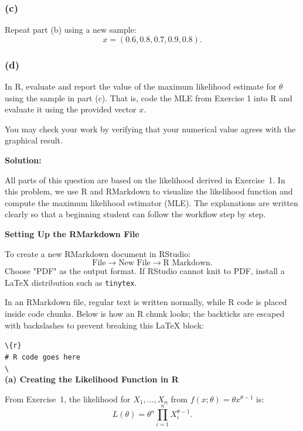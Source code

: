 \documentclass[11pt,letterpaper]{article}
\theoremstyle{remark}
\begin{document}
\subsubsection*{(c)}
Repeat part (b) using a new sample:
\[
x = (0.6, 0.8, 0.7, 0.9, 0.8).
\]

\subsubsection*{(d)}
In R, evaluate and report the value of the maximum likelihood estimate for $\theta$ using the sample in
part (c). That is, code the MLE from Exercise 1 into R and evaluate it using the provided vector $x$.

You may check your work by verifying that your numerical value agrees with the graphical result.

\vspace{1cm}

\textbf{Solution:}

All parts of this question are based on the likelihood derived in Exercise~1. In this problem, we use R and RMarkdown to visualize the likelihood function and compute the maximum likelihood estimator (MLE). The explanations are written clearly so that a beginning student can follow the workflow step by step.

\medskip
\noindent\textbf{Setting Up the RMarkdown File}

To create a new RMarkdown document in RStudio:
\[
\text{File} \rightarrow \text{New File} \rightarrow \text{R Markdown}.
\]
Choose "PDF" as the output format. If RStudio cannot knit to PDF, install a \LaTeX{} distribution such as \texttt{tinytex}.

In an RMarkdown file, regular text is written normally, while R code is placed inside code chunks. Below is how an R chunk looks; the backticks are escaped with backslashes to prevent breaking this LaTeX block:

\texttt{\textbackslash{}\textbacktick{}\textbacktick{}\textbacktick\{r\}} \\
\texttt{\# R code goes here} \\
\texttt{\textbackslash{}\textbacktick{}\textbacktick{}\textbacktick} \\

\medskip
\noindent\textbf{(a) Creating the Likelihood Function in R}

From Exercise~1, the likelihood for $X_1,\dots,X_n$ from $f(x;\theta)=\theta x^{\theta-1}$ is:
\[
L(\theta)=\theta^n\prod_{i=1}^n X_i^{\theta-1}.
\]
\end{document}

